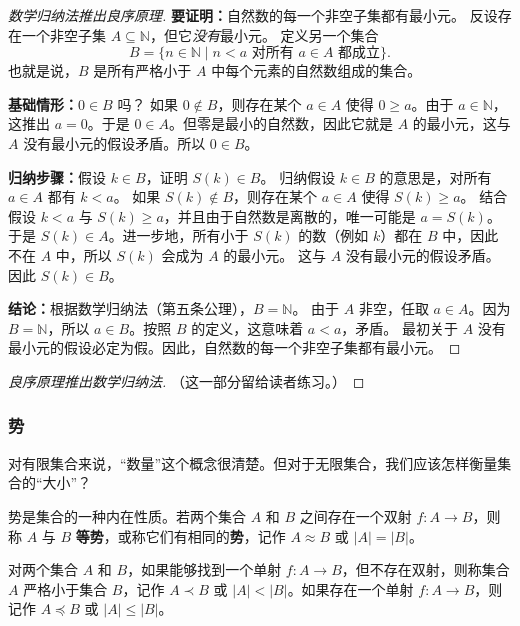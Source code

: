 \begin{proof}[数学归纳法推出良序原理]
\textbf{要证明：}自然数的每一个非空子集都有最小元。
反设存在一个非空子集 $A\subseteq \mathbb{N}$，但它\emph{没有}最小元。
定义另一个集合
\[
B=\{n\in \mathbb{N}\mid n<a\text{ 对所有 }a\in A\text{ 都成立}\}.
\]
也就是说，$B$ 是所有严格小于 $A$ 中每个元素的自然数组成的集合。

\textbf{基础情形：}$0\in B$ 吗？
如果 $0\notin B$，则存在某个 $a\in A$ 使得 $0\ge a$。由于 $a\in \mathbb{N}$，这推出 $a=0$。于是 $0\in A$。但零是最小的自然数，因此它就是 $A$ 的最小元，这与 $A$ 没有最小元的假设矛盾。所以 $0\in B$。

\textbf{归纳步骤：}假设 $k\in B$，证明 $S(k)\in B$。
归纳假设 $k\in B$ 的意思是，对所有 $a\in A$ 都有 $k<a$。
如果 $S(k)\notin B$，则存在某个 $a\in A$ 使得 $S(k)\ge a$。
结合假设 $k<a$ 与 $S(k)\ge a$，并且由于自然数是离散的，唯一可能是 $a=S(k)$。
于是 $S(k)\in A$。进一步地，所有小于 $S(k)$ 的数（例如 $k$）都在 $B$ 中，因此不在 $A$ 中，所以 $S(k)$ 会成为 $A$ 的最小元。
这与 $A$ 没有最小元的假设矛盾。因此 $S(k)\in B$。

\textbf{结论：}根据数学归纳法（第五条公理），$B=\mathbb{N}$。
由于 $A$ 非空，任取 $a\in A$。因为 $B=\mathbb{N}$，所以 $a\in B$。按照 $B$ 的定义，这意味着 $a<a$，矛盾。
最初关于 $A$ 没有最小元的假设必定为假。因此，自然数的每一个非空子集都有最小元。
\end{proof}

\begin{proof}[良序原理推出数学归纳法]
（这一部分留给读者练习。）
\end{proof}

\subsubsection*{势}
对有限集合来说，“数量”这个概念很清楚。但对于无限集合，我们应该怎样衡量集合的“大小”？
\begin{definition}[势 / 等势]
势是集合的一种内在性质。若两个集合 $A$ 和 $B$ 之间存在一个双射 $f:A\to B$，则称 $A$ 与 $B$ \textbf{等势}，或称它们有相同的\textbf{势}，记作 $A\approx B$ 或 $|A|=|B|$。
\end{definition}

\begin{definition}
对两个集合 $A$ 和 $B$，如果能够找到一个单射 $f:A\to B$，但不存在双射，则称集合 $A$ 严格小于集合 $B$，记作 $A\prec B$ 或 $|A|<|B|$。如果存在一个单射 $f:A\to B$，则记作 $A\preceq B$ 或 $|A|\le |B|$。
\end{definition}

